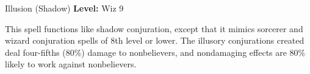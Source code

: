 {Illusion (Shadow)}
{
	\textbf{Level:}
	Wiz 9\\
}
{
	This spell functions like shadow conjuration, except that it mimics sorcerer and wizard conjuration spells of 8th level or lower. The illusory conjurations created deal four-fifths (80\%) damage to nonbelievers, and nondamaging effects are 80\% likely to work against nonbelievers.

}
